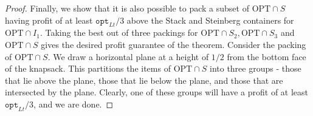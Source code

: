 \documentclass[10pt,a4paper]{amsart}
\theoremstyle{definition}
\newcommand{\optlt}{\mathtt{opt}_{Lt}}
\begin{document}
\begin{proof}
    Finally, we show that it is also possible to pack a subset of $\text{OPT}\cap S$ having profit of at least $\optlt/3$ above the Stack and Steinberg containers for $\text{OPT}\cap I_1$. Taking the best out of three packings for $\text{OPT}\cap S_2, \text{OPT}\cap S_3$ and $\text{OPT}\cap S$ gives the desired profit guarantee of the theorem.  Consider the packing of $\text{OPT}\cap S$. We draw a horizontal plane at a height of $1/2$ from the bottom face of the knapsack. This partitions the items of $\text{OPT}\cap S$ into three groups - those that lie above the plane, those that lie below the plane, and those that are intersected by the plane. Clearly, one of these groups will have a profit of at least $\optlt/3$, and we are done.
\end{proof}
\end{document}
